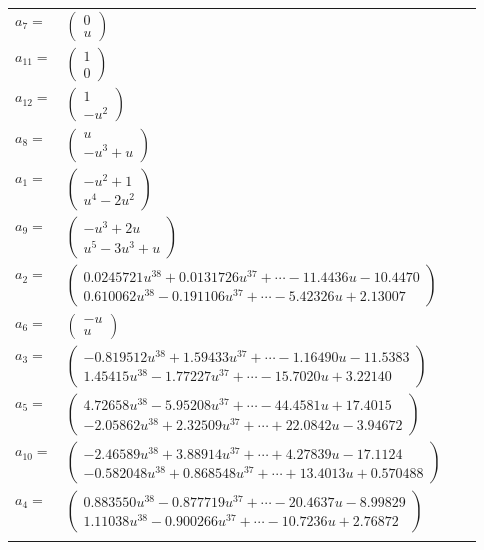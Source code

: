 \documentclass[1p]{elsarticle_modified}
\theoremstyle{definition}
\begin{document}
\begin{tabular}{m{7pt} m{180pt} m{7pt} m{180pt} }
\flushright $a_{7}=$&$\begin{pmatrix}0\\u\end{pmatrix}$ \\
\flushright $a_{11}=$&$\begin{pmatrix}1\\0\end{pmatrix}$ \\
\flushright $a_{12}=$&$\begin{pmatrix}1\\- u^2\end{pmatrix}$ \\
\flushright $a_{8}=$&$\begin{pmatrix}u\\- u^3+u\end{pmatrix}$ \\
\flushright $a_{1}=$&$\begin{pmatrix}- u^2+1\\u^4-2 u^2\end{pmatrix}$ \\
\flushright $a_{9}=$&$\begin{pmatrix}- u^3+2 u\\u^5-3 u^3+u\end{pmatrix}$ \\
\flushright $a_{2}=$&$\begin{pmatrix}0.0245721 u^{38}+0.0131726 u^{37}+\cdots-11.4436 u-10.4470\\0.610062 u^{38}-0.191106 u^{37}+\cdots-5.42326 u+2.13007\end{pmatrix}$ \\
\flushright $a_{6}=$&$\begin{pmatrix}- u\\u\end{pmatrix}$ \\
\flushright $a_{3}=$&$\begin{pmatrix}-0.819512 u^{38}+1.59433 u^{37}+\cdots-1.16490 u-11.5383\\1.45415 u^{38}-1.77227 u^{37}+\cdots-15.7020 u+3.22140\end{pmatrix}$ \\
\flushright $a_{5}=$&$\begin{pmatrix}4.72658 u^{38}-5.95208 u^{37}+\cdots-44.4581 u+17.4015\\-2.05862 u^{38}+2.32509 u^{37}+\cdots+22.0842 u-3.94672\end{pmatrix}$ \\
\flushright $a_{10}=$&$\begin{pmatrix}-2.46589 u^{38}+3.88914 u^{37}+\cdots+4.27839 u-17.1124\\-0.582048 u^{38}+0.868548 u^{37}+\cdots+13.4013 u+0.570488\end{pmatrix}$ \\
\flushright $a_{4}=$&$\begin{pmatrix}0.883550 u^{38}-0.877719 u^{37}+\cdots-20.4637 u-8.99829\\1.11038 u^{38}-0.900266 u^{37}+\cdots-10.7236 u+2.76872\end{pmatrix}$\\&\end{tabular}
\end{document}
